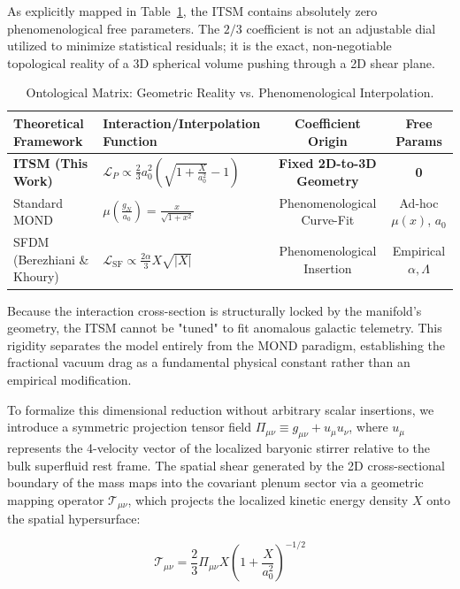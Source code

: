 \documentclass[aps,prd,10pt,onecolumn,superscriptaddress,nofootinbib]{revtex4-2}
\begin{document}
As explicitly mapped in Table~\ref{tab:mond_matrix}, the ITSM contains absolutely zero phenomenological free parameters. The $2/3$ coefficient is not an adjustable dial utilized to minimize statistical residuals; it is the exact, non-negotiable topological reality of a 3D spherical volume pushing through a 2D shear plane.

\begin{table}[htbp]
\caption{\label{tab:mond_matrix}Ontological Matrix: Geometric Reality vs. Phenomenological Interpolation.}
\begin{ruledtabular}
\begin{tabular}{llcc}
\textbf{Theoretical Framework} & \textbf{Interaction/Interpolation Function} & \textbf{Coefficient Origin} & \textbf{Free Params} \\
\hline
\textbf{ITSM (This Work)} & $\mathcal{L}_{P} \propto \frac{2}{3} a_0^2 \left(\sqrt{1+\frac{X}{a_0^2}}-1\right)$ & \textbf{Fixed 2D-to-3D Geometry} & \textbf{0} \\
Standard MOND & $\mu\left(\frac{g_N}{a_0}\right) = \frac{x}{\sqrt{1+x^2}}$ & Phenomenological Curve-Fit & Ad-hoc $\mu(x)$, $a_0$ \\
SFDM (Berezhiani \& Khoury) & $\mathcal{L}_{\text{SF}} \propto \frac{2\alpha}{3} X\sqrt{|X|}$ & Phenomenological Insertion & Empirical $\alpha, \Lambda$ \\
\end{tabular}
\end{ruledtabular}
\end{table}

Because the interaction cross-section is structurally locked by the manifold's geometry, the ITSM cannot be "tuned" to fit anomalous galactic telemetry. This rigidity separates the model entirely from the MOND paradigm, establishing the fractional vacuum drag as a fundamental physical constant rather than an empirical modification.

To formalize this dimensional reduction without arbitrary scalar insertions, we introduce a symmetric projection tensor field $\Pi_{\mu\nu} \equiv g_{\mu\nu} + u_{\mu}u_{\nu}$, where $u_{\mu}$ represents the 4-velocity vector of the localized baryonic stirrer relative to the bulk superfluid rest frame. The spatial shear generated by the 2D cross-sectional boundary of the mass maps into the covariant plenum sector via a geometric mapping operator $\mathcal{T}_{\mu\nu}$, which projects the localized kinetic energy density $X$ onto the spatial hypersurface:

\begin{equation}
\mathcal{T}_{\mu\nu} = \frac{2}{3} \Pi_{\mu\nu} X \left( 1 + \frac{X}{a_0^2} \right)^{-1/2}
\end{equation}
\end{document}
